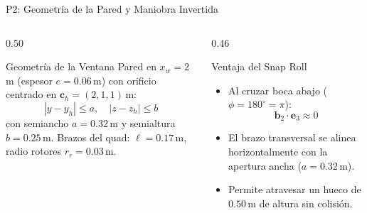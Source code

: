 \begin{frame}{P2: Geometría de la Pared y Maniobra Invertida}
\begin{columns}[T]
\begin{column}{0.50\textwidth}
\begin{tbox}{Geometría de la Ventana}
\small
Pared en $x_w=2$\,m (espesor $e=0.06$\,m) con orificio centrado en $\bm{c}_h = (2, 1, 1)$\,m:
\begin{equation*}
|y - y_h| \le a,\quad |z - z_h| \le b
\end{equation*}
con semiancho $a=0.32$\,m y semialtura $b=0.25$\,m.
\vskip4pt
Brazos del quad: $\ell=0.17$\,m, radio rotores $r_r=0.03$\,m.
\end{tbox}
\end{column}

\begin{column}{0.46\textwidth}
\begin{tbox}{Ventaja del Snap Roll}
\small
\begin{itemize}
\item Al cruzar boca abajo ($\phi = 180^\circ = \pi$):
\begin{equation*}
\bm{b}_2 \cdot \mathbf{e}_3 \approx 0
\end{equation*}
\item El brazo transversal se alinea horizontalmente con la apertura ancha ($a=0.32$\,m).
\item Permite atravesar un hueco de $0.50$\,m de altura sin colisión.
\end{itemize}
\end{tbox}
\end{column}
\end{columns}
\end{frame}

